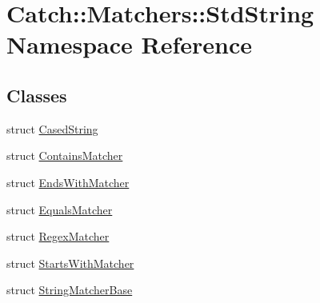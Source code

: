 \hypertarget{namespace_catch_1_1_matchers_1_1_std_string}{}\section{Catch\+:\+:Matchers\+:\+:Std\+String Namespace Reference}
\label{namespace_catch_1_1_matchers_1_1_std_string}
\subsection*{Classes}
\begin{DoxyCompactItemize}
\item 
struct \mbox{\hyperlink{struct_catch_1_1_matchers_1_1_std_string_1_1_cased_string}{Cased\+String}}
\item 
struct \mbox{\hyperlink{struct_catch_1_1_matchers_1_1_std_string_1_1_contains_matcher}{Contains\+Matcher}}
\item 
struct \mbox{\hyperlink{struct_catch_1_1_matchers_1_1_std_string_1_1_ends_with_matcher}{Ends\+With\+Matcher}}
\item 
struct \mbox{\hyperlink{struct_catch_1_1_matchers_1_1_std_string_1_1_equals_matcher}{Equals\+Matcher}}
\item 
struct \mbox{\hyperlink{struct_catch_1_1_matchers_1_1_std_string_1_1_regex_matcher}{Regex\+Matcher}}
\item 
struct \mbox{\hyperlink{struct_catch_1_1_matchers_1_1_std_string_1_1_starts_with_matcher}{Starts\+With\+Matcher}}
\item 
struct \mbox{\hyperlink{struct_catch_1_1_matchers_1_1_std_string_1_1_string_matcher_base}{String\+Matcher\+Base}}
\end{DoxyCompactItemize}
